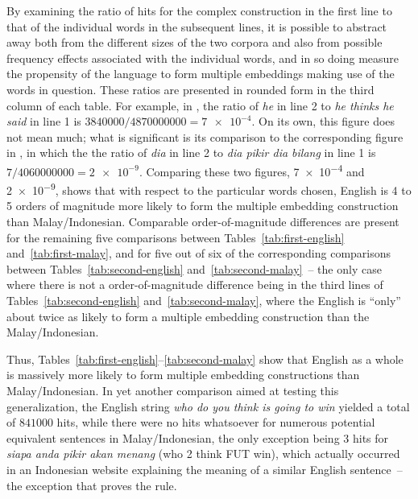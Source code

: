 \documentclass[output=paper]{langscibook}
\begin{document}
By examining the ratio of hits for the complex construction in the first line to that of the individual words in the subsequent lines, it is possible to abstract away both from the different sizes of the two corpora and also from possible frequency effects associated with the individual words, and in so doing measure the propensity of the language to form multiple embeddings making use of the words in question.  These ratios are presented in rounded form in the third column of each table.  For example, in , the ratio of \textit{he} in line 2 to \textit{he thinks he said} in line 1 is $\num{3840000} / \num{4870000000} = \num{7e-4}$.  On its own, this figure does not mean much; what is significant is its comparison to the corresponding figure in , in which the the ratio of \textit{dia} in line 2 to \textit{dia pikir dia bilang} in line 1 is $7 / \num{4060000000} = \num{2e-9}$.  Comparing these two figures, \num{7e-4} and \num{2e-9}, shows that with respect to the particular words chosen, English is 4 to 5 orders of magnitude more likely to form the multiple embedding construction than Malay\slash Indonesian.  Comparable order-of-magnitude differences are present for the remaining five comparisons between Tables~\ref{tab:first-english} and~\ref{tab:first-malay}, and for five out of six of the corresponding comparisons between Tables~\ref{tab:second-english} and~\ref{tab:second-malay}~– the only case where there is not a order-of-magnitude difference being in the third lines of Tables~\ref{tab:second-english} and~\ref{tab:second-malay}, where the English is ``only'' about twice as likely to form a multiple embedding construction than the Malay\slash Indonesian.

Thus, Tables~\ref{tab:first-english}--\ref{tab:second-malay} show that English as a whole is massively more likely to form multiple embedding constructions than Malay\slash Indonesian.  In yet another comparison aimed at testing this generalization, the English string \textit{who do you think is going to win} yielded a total of $\num{841000}$ hits, while there were no hits whatsoever for numerous potential equivalent sentences in Malay\slash Indonesian, the only exception being 3 hits for \textit{siapa anda pikir akan menang} (who 2 think FUT win), which actually occurred in an Indonesian website explaining the meaning of a similar English sentence~– the exception that proves the rule.
\end{document}
